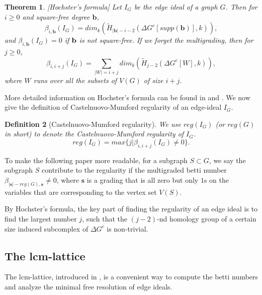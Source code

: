 \documentclass[dvipsnames,10pt]{article}
\newtheorem{theorem}{Theorem}[section]
\newtheorem{defi}[theorem]{Definition}
\begin{document}
\begin{theorem}[Hochster's formula]
    Let $I_G$ be the edge ideal of a graph $G$. Then for $i\geq 0$ and square-free degree $\mathbf{b}$,
    \begin{equation*}
        \beta_{i,\mathbf{b}}(I_G)=dim_k(\widetilde{H}_{|\mathbf{b}|-i-2}\left(\Delta G^c[supp(\mathbf{b})], k\right)),
    \end{equation*}
    and $\beta_{i,\mathbf{b}}(I_G)=0$ if $\bf{b}$ is not square-free. If we forget the multigrading, then for $j\geq0$,
    \begin{equation*}
        \beta_{i,i+j}(I_G)=\sum_{|W|=i+j}dim_k(\widetilde{H}_{j-2}\left(\Delta G^c[W], k\right)),
    \end{equation*}
    where $W$ runs over all the subsets of $V(G)$ of size $i+j$.
\end{theorem}
More detailed information on Hochster's formula can be found in \cite{stanley1996combinatorics} and \cite{francisco2014survey}. We now give the definition of Castelnuovo-Mumford regularity of an edge-ideal $I_G$.
\begin{defi}[Castelnuovo-Mumford regularity]
    We use $reg(I_G)$ (or $reg(G)$ in short) to denote the Castelnuovo-Mumford regularity of $I_G$. 
    \begin{equation*}
    reg(I_G)=max\{j|\beta_{i,i+j}(I_G)\neq0\}.    
    \end{equation*}
\end{defi}

To make the following paper more readable, for a subgraph $S\subset G$, we say the subgraph $S$ contribute to the regularity if the multigraded betti number $\beta_{|\mathbf{s}|-reg(G),\mathbf{s}}\neq 0$, where $\mathbf{s}$ is a grading that is all zero but only $1$s on the variables that are corresponding to the vertex set $V(S)$.

By Hochster's formula, the key part of finding the regularity of an edge ideal is to find the largest number $j$, such that the $(j-2)$-nd homology group of a certain size induced subcomplex of $\Delta G^c$ is non-trivial. 

\subsection{The lcm-lattice}

The lcm-lattice, introduced in \cite{welker1999lcm}, is a convenient way to compute the betti numbers and analyze the minimal free resolution of edge ideals. 
\end{document}
